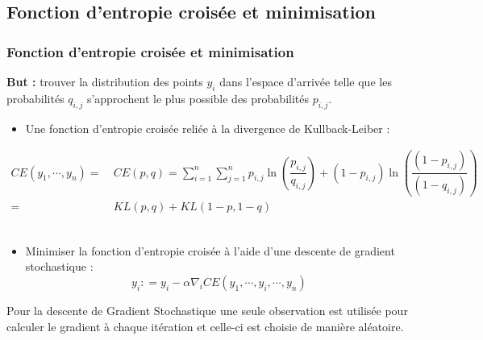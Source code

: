 \documentclass{beamer}
\theoremstyle{definition}
\begin{document}
\subsection{Fonction d'entropie croisée et minimisation}
\begin{frame}
	\frametitle{Fonction d'entropie croisée et minimisation}

	\textcolor{modernvert}{\textbf{But :}} trouver la distribution des points $y_i$ dans l'espace d'arrivée telle que les probabilités $q_{i,j}$ s'approchent le plus possible des probabilités $p_{i,j}$.
	\begin{itemize}
		\item Une fonction d’entropie croisée reliée à la divergence de Kullback-Leiber : 
		
	\end{itemize}
\begin{align*}
	CE(y_1,\cdots,y_n) =& \ CE(p,q) = \sum_{i=1}^{n}\sum_{j=1}^{n}p_{i,j}\ln\left(\dfrac{p_{i,j}}{q_{i,j}}\right) + (1-p_{i,j})\ln\left(\dfrac{(1-p_{i,j})}{(1 - q_{i,j})}\right)\\
	=&\  KL(p,q) + KL(1-p,1-q)
\end{align*}\quad\\[-0.25cm]
\begin{itemize}
		
		\item Minimiser la fonction d'entropie croisée à l'aide d'une descente de gradient stochastique :\\[-0.25cm]
		
		$$y_i : = y_i -\alpha \nabla_iCE (y_1,\cdots,y_i,\cdots,y_n)$$
		 
	\end{itemize}
	
		Pour la descente de Gradient Stochastique une seule observation est utilisée pour calculer le gradient à chaque itération et celle-ci est choisie de manière aléatoire.
	
\end{frame}
\end{document}
